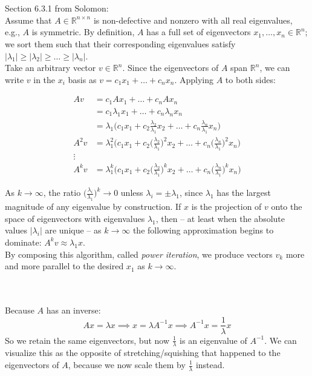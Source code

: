 \documentclass{article}
\newcommand\ifrac[2]{{\displaystyle\frac{#1}{#2}}}
\def\R{\mathbb{R}}
\def\R{\mathbb{R}}
\begin{document}
\vspace{1.8cm}
\\\\

Section 6.3.1 from Solomon:\\

Assume that $A \in \R^{n \times n}$ is non-defective and nonzero with all real eigenvalues,
e.g., $A$ is symmetric. By definition, $A$ has a full set of eigenvectors $x_1,\dots,x_n \in \R^n$; 
we sort them such that their corresponding eigenvalues satisfy $|\lambda_1| \ge |\lambda_2| \ge \dots \ge |\lambda_n|$.\\

Take an arbitrary vector $v \in \R^n$. Since the eigenvectors of $A$ span $\R^n$, we can write
$v$ in the $x_i$ basis as $v = c_1x_1 + \dots + c_nx_n$. Applying $A$ to both sides:

\begin{align*}
    Av &= c_1Ax_1 + \dots + c_nAx_n \\
        &= c_1\lambda_1x_1 + \dots + c_n\lambda_nx_n \tag*{since $Ax_i = \lambda x_i$} \\
        &= \lambda_1 \Big( c_1x_1 + c_2\frac{\lambda_2}{\lambda_1}x_2 + \dots + c_n\frac{\lambda_n}{\lambda_1}x_n \Big) \\
    A^2v &= \lambda_1^2 \Big(c_1x_1 + c_2\Big(\frac{\lambda_2}{\lambda_1}\Big)^2x_2 + \dots + c_n\Big(\frac{\lambda_n}{\lambda_1}\Big)^2x_n \Big) \\
    \vdots \\
    A^kv &= \lambda_1^k \Big(c_1x_1 + c_2\Big(\frac{\lambda_2}{\lambda_1}\Big)^kx_2 + \dots + c_n\Big(\frac{\lambda_n}{\lambda_1}\Big)^kx_n \Big)
\end{align*}

As $k \rightarrow \infty$, the ratio $\Big(\ifrac{\lambda_i}{\lambda_1}\Big)^k \rightarrow 0$ unless $\lambda_i = \pm \lambda_1$,
since $\lambda_1$ has the largest magnitude of any eigenvalue by construction. If $x$ is the projection of $v$ onto the space
of eigenvectors with eigenvalues $\lambda_1$, then -- at least when the absolute values $|\lambda_i|$ are unique --
as $k \rightarrow \infty$ the following approximation begins to dominate: $A^kv \approx \lambda_1x$.\\

By composing this algorithm, called \emph{power iteration}, we produce vectors $v_k$ more and more parallel
to the desired $x_1$ as $k \rightarrow \infty$.


\vspace{1.8cm}
\\\\


Because $A$ has an inverse:
$$
    Ax = \lambda x \implies x = \lambda A^{-1}x \implies A^{-1}x = \ifrac{1}{\lambda}x
$$
So we retain the same eigenvectors, but now $\frac{1}{\lambda}$ is an eigenvalue of $A^{-1}$.
We can visualize this as the opposite of stretching/squishing
that happened to the eigenvectors of $A$, because we now scale them by $\frac{1}{\lambda}$ instead.
\end{document}

